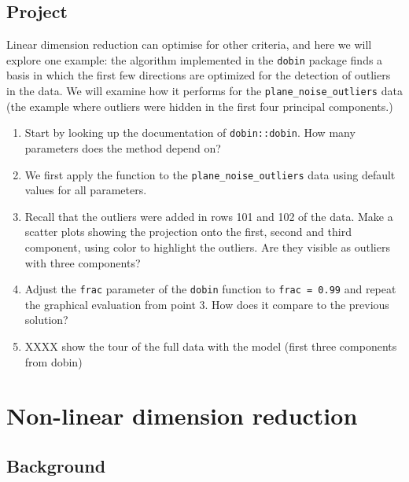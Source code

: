 \documentclass[
  letterpaper,
]{book}
\providecommand{\tightlist}{%
  \setlength{\itemsep}{0pt}\setlength{\parskip}{0pt}}\usepackage{longtable,booktabs,array}
\begin{document}
\hypertarget{project}{%
\section*{Project}\label{project}}


Linear dimension reduction can optimise for other criteria, and here we
will explore one example: the algorithm implemented in the
\texttt{dobin} package finds a basis in which the first few directions
are optimized for the detection of outliers in the data. We will examine
how it performs for the \texttt{plane\_noise\_outliers} data (the
example where outliers were hidden in the first four principal
components.)

\begin{enumerate}
\def\labelenumi{\arabic{enumi}.}
\tightlist
\item
  Start by looking up the documentation of \texttt{dobin::dobin}. How
  many parameters does the method depend on?
\item
  We first apply the function to the \texttt{plane\_noise\_outliers}
  data using default values for all parameters.
\item
  Recall that the outliers were added in rows 101 and 102 of the data.
  Make a scatter plots showing the projection onto the first, second and
  third component, using color to highlight the outliers. Are they
  visible as outliers with three components?
\item
  Adjust the \texttt{frac} parameter of the \texttt{dobin} function to
  \texttt{frac\ =\ 0.99} and repeat the graphical evaluation from point
  3. How does it compare to the previous solution?
\item
  XXXX show the tour of the full data with the model (first three
  components from dobin)
\end{enumerate}

\hypertarget{non-linear-dimension-reduction}{%
\chapter{Non-linear dimension
reduction}\label{non-linear-dimension-reduction}}

\hypertarget{background}{%
\section{Background}\label{background}}
\end{document}
